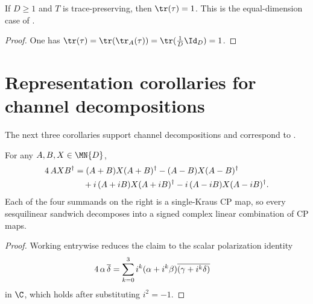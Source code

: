 \begin{theorem}\label{thm:trace_choiMatrix_of_tp}
    \leanok
    If $D\geq1$ and $T$ is trace-preserving, then $\tr(\tau) = 1$.
    This is the equal-dimension case of
    \cite[Proposition~2.1]{Wolf2012Quantum}.
\end{theorem}

\begin{proof}
    \leanok
    One has
    $\tr(\tau)
        = \tr(\tr_A(\tau))
        = \tr(\frac{1}{D}\Id_D)
        = 1$.
\end{proof}

\section{Representation corollaries for channel decompositions}
\label{sec:representation_corollaries}

The next three corollaries support channel decompositions and correspond to
\cite[Propositions~2.2--2.4]{Wolf2012Quantum}.

\begin{theorem}
    \label{thm:polarization_sandwich}
    \leanok
    For any $A, B, X \in \MN{D}$,
    \begin{align}
        4\,A X B^\dagger
        &= (A+B) X (A+B)^\dagger - (A-B) X (A-B)^\dagger
        \notag\\
        &\quad
        + i\,(A + iB) X (A + iB)^\dagger
        - i\,(A - iB) X (A - iB)^\dagger.
        \label{eq:representations_polarization}
    \end{align}
    Each of the four summands on the right is a single-Kraus CP map, so
    every sesquilinear sandwich decomposes into a signed complex linear
    combination of CP maps.
\end{theorem}

\begin{proof}
    \leanok
    Working entrywise reduces the claim to the scalar polarization identity
    \begin{align}
        4\,\alpha\,\overline{\delta}
        &= \sum_{k=0}^{3} i^k
        (\alpha + i^k \beta)\overline{(\gamma + i^k \delta)}
        \notag
    \end{align}
    in $\C$, which holds after substituting $i^2 = -1$.
\end{proof}

